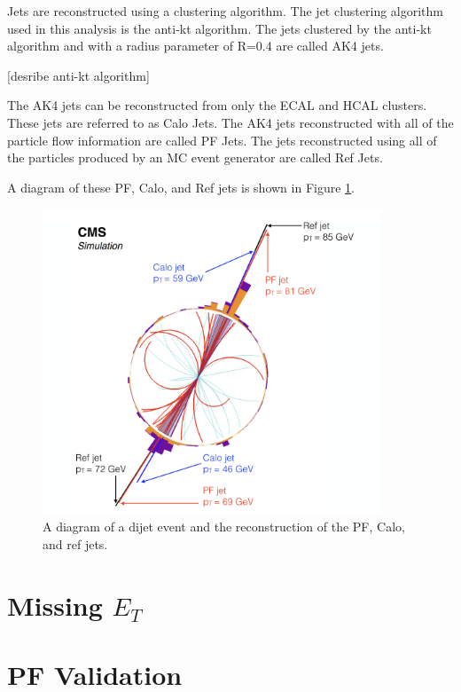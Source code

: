 Jets are reconstructed using a clustering algorithm. The jet clustering algorithm used in this analysis is the anti-kt algorithm. The jets clustered by the anti-kt algorithm and with a radius parameter of R=0.4 are called AK4 jets. 

[desribe anti-kt algorithm]

The AK4 jets can be reconstructed from only the ECAL and HCAL clusters. These jets are referred to as Calo Jets. The AK4 jets reconstructed with all of the particle flow information are called PF Jets. The jets reconstructed using all of the particles produced by an MC event generator are called Ref Jets. 


A diagram of these PF, Calo, and Ref jets is shown in Figure \ref{fig:pfjet}.

\begin{figure}[h]
\centering
\includegraphics[width=0.9\textwidth]{figures/pf_jet_diagram}
\caption{A diagram of a dijet event and the reconstruction of the PF, Calo, and ref jets.}
\label{fig:pfjet}
\end{figure}

\section{Missing $E_T$}


\section{PF Validation}

